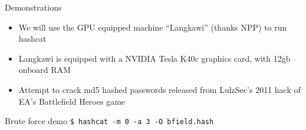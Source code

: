 \documentclass[12pt,aspectratio=169]{beamer}
\renewcommand{\emph}[1]{{\color{mLightBrown}#1}}
\begin{document}
\begin{frame}{Demonstrations}
    \begin{itemize}
        \item We will use the GPU equipped machine ``Langkawi'' (thanks NPP) to run hashcat
        \item Langkawi is equipped with a NVIDIA Tesla K40c graphics card, with 12gb onboard RAM
	\item Attempt to crack \emph{md5 hashed} passwords released from LulzSec's 2011 hack of EA's Battlefield Heroes game
    \end{itemize}
\end{frame}

\begin{frame}{Brute force demo}
    \lstinline|$ hashcat -m 0 -a 3 -O bfield.hash|
\end{frame}
\end{document}
